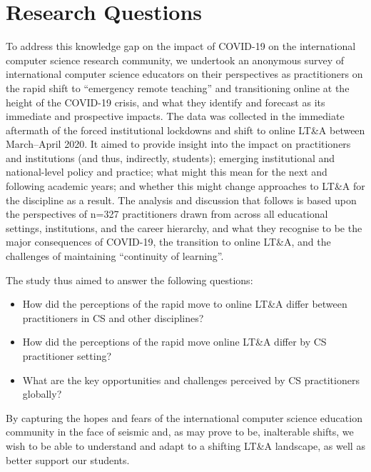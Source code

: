 \documentclass[conference]{IEEEtran}
\begin{document}

\section{Research Questions}\label{rqs}

To address this knowledge gap on the impact of COVID-19 on the
international computer science research community, we undertook an
anonymous survey of international computer science educators on their
perspectives as practitioners on the rapid shift to ``emergency remote
teaching'' and transitioning online at the height of the COVID-19
crisis, and what they identify and forecast as its immediate and
prospective impacts. The data was collected in the immediate aftermath
of the forced institutional lockdowns and shift to online LT\&A
between March--April 2020. It aimed to provide insight into the impact
on practitioners and institutions (and thus, indirectly, students);
emerging institutional and national-level policy and practice; what
might this mean for the next and following academic years; and whether
this might change approaches to LT\&A for the discipline as a
result. The analysis and discussion that follows is based upon the
perspectives of n=327 practitioners drawn from across all educational
settings, institutions, and the career hierarchy, and what they
recognise to be the major consequences of COVID-19, the transition to
online LT\&A, and the challenges of maintaining ``continuity of
learning''.

The study thus aimed to answer the following questions:

\begin{itemize}
\item How did the perceptions of the rapid move to online LT\&A differ
between practitioners in CS and other disciplines?
\item How did the perceptions of the rapid move online LT\&A differ by
CS practitioner setting?
\item What are the key opportunities and challenges perceived by CS
practitioners globally?
\end{itemize}

By capturing the hopes and fears of the international computer science
education community in the face of seismic and, as may prove to be,
inalterable shifts, we wish to be able to understand and adapt to a
shifting LT\&A landscape, as well as better support our students.
\end{document}
